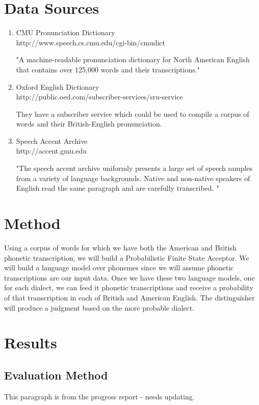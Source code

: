 \documentclass[11pt, letterpaper, oneside]{article}
\begin{document}
\section{Data Sources}
	\begin{enumerate}
		\item CMU Pronunciation Dictionary \\ http://www.speech.cs.cmu.edu/cgi-bin/cmudict
		
		"A machine-readable pronunciation dictionary for North American English that contains over 125,000 words and their transcriptions."
		
		\item Oxford English Dictionary \\ http://public.oed.com/subscriber-services/sru-service
		
		They have a subscriber service which could be used to compile a corpus of words and their British-English pronunciation.
		
		\item Speech Accent Archive \\ http://accent.gmu.edu
		
		"The speech accent archive uniformly presents a large set of speech samples from a variety of language backgrounds. 
		Native and non-native speakers of English read the same paragraph and are carefully transcribed. "
	\end{enumerate}

\section{ Method }
Using a corpus of words for which we have both the American and British phonetic transcription, we will build a Probabilistic Finite State Acceptor.
We will build a language model over phonemes since we will assume phonetic transcriptions are our input data.
Once we have these two language models, one for each dialect, we can feed it phonetic transcriptions and receive a probability of that transcription in each of British and American English.
The distinguisher will produce a judgment based on the more probable dialect.


\section{ Results }

	\subsection{ Evaluation Method }
	This paragraph is from the progress report - needs updating.
	
\end{document}
